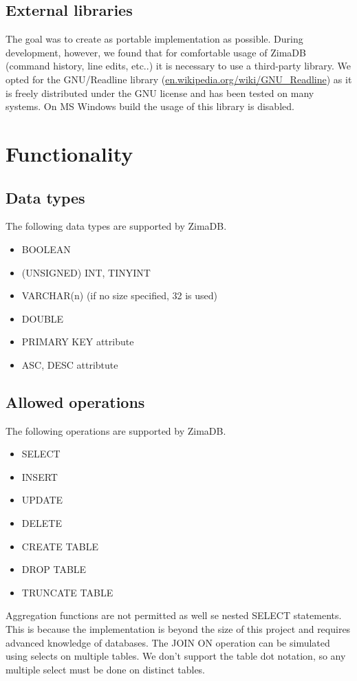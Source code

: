 \documentclass[a4paper]{article}
\begin{document}
\subsection{External libraries}
The goal was to create as portable implementation as possible. During development, however, we found that for comfortable usage of ZimaDB (command history, line edits, etc..) it is necessary to use a third-party library. We opted for the GNU/Readline library (\href{https://en.wikipedia.org/wiki/GNU_Readline}{en.wikipedia.org/wiki/GNU\_Readline}) as it is freely distributed under the GNU license and has been tested on many systems. On MS Windows build the usage of this library is disabled.

\section{Functionality}
\subsection{Data types}
The following data types are supported by ZimaDB.
\begin{itemize}
    \item BOOLEAN
    \item (UNSIGNED) INT, TINYINT
    \item VARCHAR(n) (if no size specified, 32 is used)
    \item DOUBLE
    \item PRIMARY KEY attribute
    \item ASC, DESC attribtute
\end{itemize}

\subsection{Allowed operations}
The following operations are supported by ZimaDB.
\begin{itemize}
    \item SELECT
    \item INSERT
    \item UPDATE
    \item DELETE
    \item CREATE TABLE
    \item DROP TABLE
    \item TRUNCATE TABLE
\end{itemize}
Aggregation functions are not permitted as well se nested SELECT statements. This is because the implementation is beyond the size of this project and requires advanced knowledge of databases. The JOIN ON operation can be simulated using selects on multiple tables. We don't support the table dot notation, so any multiple select must be done on distinct tables. 
\end{document}
